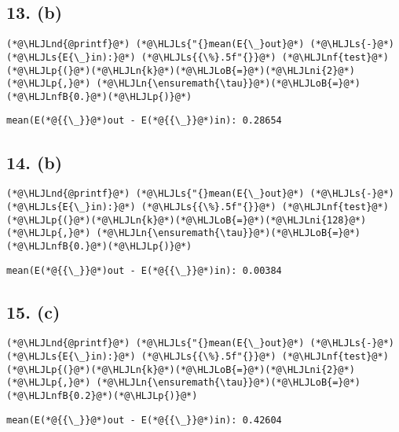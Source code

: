 \documentclass[12pt,a4paper]{article}
\newcommand{\HLJLn}[1]{#1}
\newcommand{\HLJLnd}[1]{\textcolor[RGB]{214,102,97}{#1}}
\newcommand{\HLJLnf}[1]{\textcolor[RGB]{66,102,213}{#1}}
\newcommand{\HLJLs}[1]{\textcolor[RGB]{201,61,57}{#1}}
\newcommand{\HLJLnfB}[1]{\textcolor[RGB]{59,151,46}{#1}}
\newcommand{\HLJLni}[1]{\textcolor[RGB]{59,151,46}{#1}}
\newcommand{\HLJLoB}[1]{\textcolor[RGB]{102,102,102}{\textbf{#1}}}
\newcommand{\HLJLp}[1]{#1}
\begin{document}
\subsection{13. (b)}

\begin{lstlisting}
(*@\HLJLnd{@printf}@*) (*@\HLJLs{"{}mean(E{\_}out}@*) (*@\HLJLs{-}@*) (*@\HLJLs{E{\_}in):}@*) (*@\HLJLs{{\%}.5f"{}}@*) (*@\HLJLnf{test}@*)(*@\HLJLp{(}@*)(*@\HLJLn{k}@*)(*@\HLJLoB{=}@*)(*@\HLJLni{2}@*)(*@\HLJLp{,}@*) (*@\HLJLn{\ensuremath{\tau}}@*)(*@\HLJLoB{=}@*)(*@\HLJLnfB{0.}@*)(*@\HLJLp{)}@*)
\end{lstlisting}

\begin{lstlisting}
mean(E(*@{{\_}}@*)out - E(*@{{\_}}@*)in): 0.28654
\end{lstlisting}


\subsection{14. (b)}

\begin{lstlisting}
(*@\HLJLnd{@printf}@*) (*@\HLJLs{"{}mean(E{\_}out}@*) (*@\HLJLs{-}@*) (*@\HLJLs{E{\_}in):}@*) (*@\HLJLs{{\%}.5f"{}}@*) (*@\HLJLnf{test}@*)(*@\HLJLp{(}@*)(*@\HLJLn{k}@*)(*@\HLJLoB{=}@*)(*@\HLJLni{128}@*)(*@\HLJLp{,}@*) (*@\HLJLn{\ensuremath{\tau}}@*)(*@\HLJLoB{=}@*)(*@\HLJLnfB{0.}@*)(*@\HLJLp{)}@*)
\end{lstlisting}

\begin{lstlisting}
mean(E(*@{{\_}}@*)out - E(*@{{\_}}@*)in): 0.00384
\end{lstlisting}


\subsection{15. (c)}

\begin{lstlisting}
(*@\HLJLnd{@printf}@*) (*@\HLJLs{"{}mean(E{\_}out}@*) (*@\HLJLs{-}@*) (*@\HLJLs{E{\_}in):}@*) (*@\HLJLs{{\%}.5f"{}}@*) (*@\HLJLnf{test}@*)(*@\HLJLp{(}@*)(*@\HLJLn{k}@*)(*@\HLJLoB{=}@*)(*@\HLJLni{2}@*)(*@\HLJLp{,}@*) (*@\HLJLn{\ensuremath{\tau}}@*)(*@\HLJLoB{=}@*)(*@\HLJLnfB{0.2}@*)(*@\HLJLp{)}@*)
\end{lstlisting}

\begin{lstlisting}
mean(E(*@{{\_}}@*)out - E(*@{{\_}}@*)in): 0.42604
\end{lstlisting}
\end{document}
